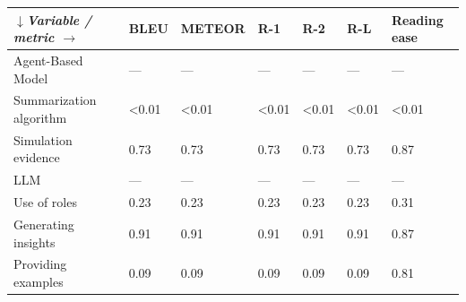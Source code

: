 \begin{tabular}{|l|l|l|l|l|l|l|}
\hline
\textit{$\downarrow$Variable / metric $\rightarrow$} & BLEU & METEOR & R-1 & R-2 & R-L & Reading ease \\
 \hline
 Agent-Based Model & — & — & — & — & — & — \\
 \hline
 Summarization algorithm & \textless{}0.01 & \textless{}0.01 & \textless{}0.01 & \textless{}0.01 & \textless{}0.01 & \textless{}0.01 \\
 \hline
 Simulation evidence & 0.73 & 0.73 & 0.73 & 0.73 & 0.73 & 0.87 \\
 \hline
 LLM & — & — & — & — & — & — \\
 \hline
 Use of roles & 0.23 & 0.23 & 0.23 & 0.23 & 0.23 & 0.31 \\
 \hline
 Generating insights & 0.91 & 0.91 & 0.91 & 0.91 & 0.91 & 0.87 \\
 \hline
 Providing examples & 0.09 & 0.09 & 0.09 & 0.09 & 0.09 & 0.81 \\
\hline
\end{tabular}
